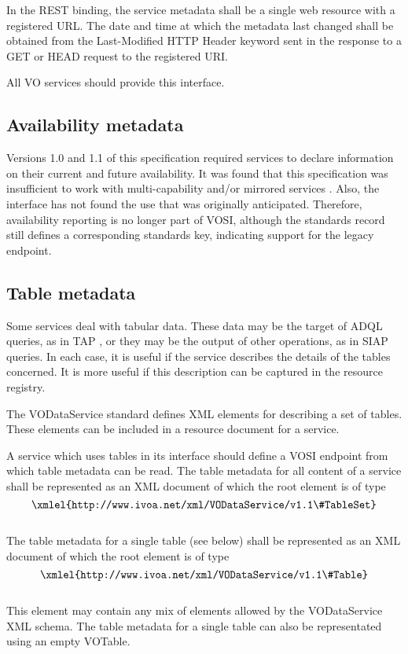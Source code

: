 \documentclass[11pt,letter]{ivoa}
\begin{document}
In the REST binding, the service metadata shall be a single web resource
with a registered URL. The date and time at which the metadata last
changed shall be obtained from the Last-Modified HTTP Header keyword
sent in the response to a GET or HEAD request to the registered URI.

All VO services should provide this interface. 

\subsection{Availability metadata}
\label{sect:availability}

Versions 1.0 and 1.1 of this specification required services to declare
information on their current and future availability.  It was found that
this specification was insufficient to work with multi-capability and/or
mirrored services \citep{note:caproles}.  Also, the interface has not
found the use that was originally anticipated.  Therefore, availability
reporting is no longer part of VOSI, although the standards record still
defines a corresponding standards key, indicating support for the legacy
endpoint.


\subsection{Table metadata}

Some services deal with tabular data. These data may be the target of
ADQL queries, as in TAP \citep{2019ivoa.spec.0927D}, or they may be the
output of other operations, as in SIAP queries. In each case, it is
useful if the service describes the details of the tables concerned. It
is more useful if this description can be captured in the resource
registry.

The VODataService standard \citep{2021ivoa.spec.1102D} defines XML
elements for describing a set of tables. These elements can be included
in a resource document for a service.

A service which uses tables in its interface should define a VOSI
endpoint from which table metadata can be read. The table metadata for
all content of a service shall be represented as an XML document of
which the root element is of type\\
$$\hbox{\xmlel{http://www.ivoa.net/xml/VODataService/v1.1\#TableSet}}$$\\
The table metadata for a single table (see below) shall be represented as an
XML document of which the root element is of type\\
$$\hbox{\xmlel{http://www.ivoa.net/xml/VODataService/v1.1\#Table}}$$\\
This element may contain any mix of elements allowed by the VODataService XML schema.
The table metadata for a single table can also be representated using an empty VOTable.
\end{document}
